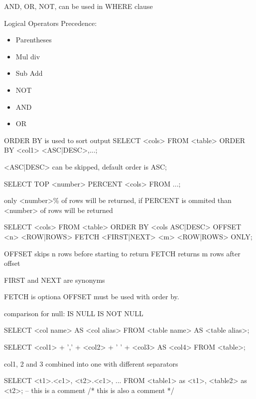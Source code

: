 \documentclass{article}
\begin{document}
    AND, OR, NOT, can be used in WHERE clause

    Logical Operators Precedence:
    \begin{itemize}
        \item Parentheses
        \item Mul div
        \item Sub Add
        \item NOT
        \item AND
        \item OR
    \end{itemize}

    ORDER BY is used to sort output
    SELECT <cols>
    FROM <table>
    ORDER BY <col1> <ASC|DESC>,...;

    <ASC|DESC> can be skipped, default order is ASC;

    SELECT TOP <number> PERCENT <cols>
    FROM ...;

    only <number>\% of rows will be returned, if PERCENT is ommited than <number> of rows will be returned

    SELECT <cols>
    FROM <table>
    ORDER BY <cols ASC|DESC>
    OFFSET <n> <ROW|ROWS>
    FETCH <FIRST|NEXT> <m> <ROW|ROWS> ONLY;

    OFFSET skips n rows before starting to return
    FETCH returns m rows after offset

    FIRST and NEXT are synonyms

    FETCH is optiona
    OFFSET must be used with order by.

    comparison for null:
    IS NULL
    IS NOT NULL

    SELECT <col name> AS <col alias>
    FROM <table name> AS <table alias>;

    SELECT <col1> + ',' + <col2> + ' ' + <col3> AS <col4>
    FROM <table>;

    col1, 2 and 3 combined into one with different separators

    SELECT <t1>.<c1>, <t2>.<c1>, ...
    FROM <table1> as <t1>, <table2> as <t2>;
    -- this is a comment
    /*
    this is also a comment
    */
\end{document}
